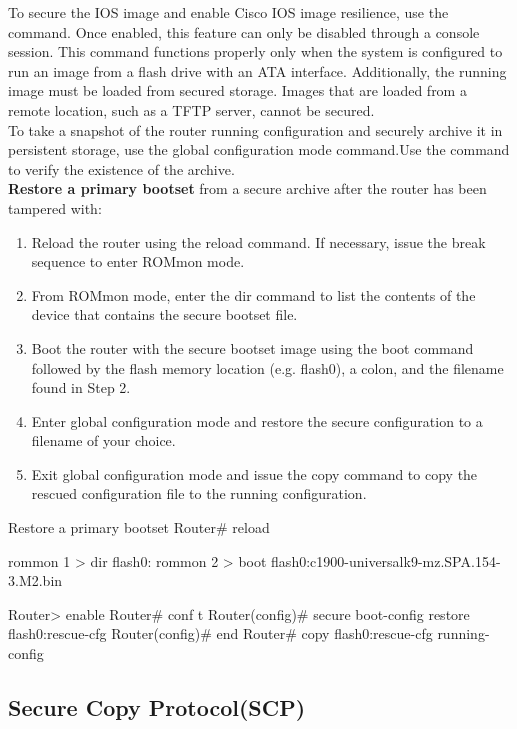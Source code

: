 To secure the IOS image and enable Cisco IOS image resilience, use the  command. Once enabled, this feature can only be disabled through a console session. This command functions properly only when the system is configured to run an image from a flash drive with an ATA interface. Additionally, the running image must be loaded from secured storage. Images that are loaded from a remote location, such as a TFTP server, cannot be secured.\\

To take a snapshot of the router running configuration and securely archive it in persistent storage, use the  global configuration mode command.Use the  command to verify the existence of the archive.\\

\textbf{Restore a primary bootset} from a secure archive after the router has been tampered with:

\begin{enumerate}
\item Reload the router using the reload command. If necessary, issue the break sequence to enter ROMmon mode.
\item From ROMmon mode, enter the dir command to list the contents of the device that contains the secure bootset file.
\item Boot the router with the secure bootset image using the boot command followed by the flash memory location (e.g. flash0), a colon, and the filename found in Step 2.
\item Enter global configuration mode and restore the secure configuration to a filename of your choice.
\item Exit global configuration mode and issue the copy command to copy the rescued configuration file to the running configuration.
\end{enumerate}

\begin{sexylisting}{Restore a primary bootset}
Router# reload

rommon 1 > dir flash0:
rommon 2 > boot flash0:c1900-universalk9-mz.SPA.154-3.M2.bin

Router> enable
Router# conf t
Router(config)# secure boot-config restore flash0:rescue-cfg
Router(config)# end
Router# copy flash0:rescue-cfg running-config
\end{sexylisting}

\subsection{Secure Copy Protocol(SCP)}

